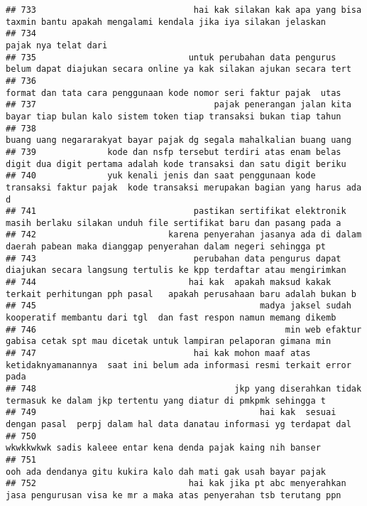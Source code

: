 \documentclass[
]{article}
\begin{document}
\begin{verbatim}
## 733                               hai kak silakan kak apa yang bisa taxmin bantu apakah mengalami kendala jika iya silakan jelaskan 
## 734                                                                                                            pajak nya telat dari 
## 735                              untuk perubahan data pengurus belum dapat diajukan secara online ya kak silakan ajukan secara tert 
## 736                                                              format dan tata cara penggunaan kode nomor seri faktur pajak  utas 
## 737                                   pajak penerangan jalan kita bayar tiap bulan kalo sistem token tiap transaksi bukan tiap tahun
## 738                                                             buang uang negararakyat bayar pajak dg segala mahalkalian buang uang
## 739              kode dan nsfp tersebut terdiri atas enam belas digit dua digit pertama adalah kode transaksi dan satu digit beriku 
## 740              yuk kenali jenis dan saat penggunaan kode transaksi faktur pajak  kode transaksi merupakan bagian yang harus ada d 
## 741                               pastikan sertifikat elektronik masih berlaku silakan unduh file sertifikat baru dan pasang pada a 
## 742                          karena penyerahan jasanya ada di dalam daerah pabean maka dianggap penyerahan dalam negeri sehingga pt 
## 743                               perubahan data pengurus dapat diajukan secara langsung tertulis ke kpp terdaftar atau mengirimkan 
## 744                              hai kak  apakah maksud kakak terkait perhitungan pph pasal   apakah perusahaan baru adalah bukan b 
## 745                                            madya jaksel sudah kooperatif membantu dari tgl  dan fast respon namun memang dikemb 
## 746                                                 min web efaktur gabisa cetak spt mau dicetak untuk lampiran pelaporan gimana min
## 747                               hai kak mohon maaf atas ketidaknyamanannya  saat ini belum ada informasi resmi terkait error pada 
## 748                                       jkp yang diserahkan tidak termasuk ke dalam jkp tertentu yang diatur di pmkpmk sehingga t 
## 749                                            hai kak  sesuai dengan pasal  perpj dalam hal data danatau informasi yg terdapat dal 
## 750                                                                   wkwkkwkwk sadis kaleee entar kena denda pajak kaing nih banser
## 751                                                                  ooh ada dendanya gitu kukira kalo dah mati gak usah bayar pajak
## 752                              hai kak jika pt abc menyerahkan jasa pengurusan visa ke mr a maka atas penyerahan tsb terutang ppn 

\end{verbatim}
\end{document}

